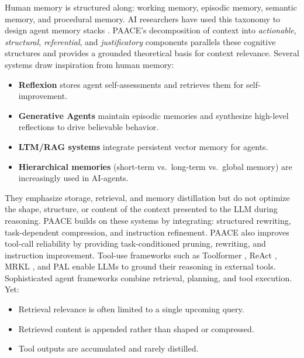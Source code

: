 \documentclass{article}
\theoremstyle{plain}
\theoremstyle{definition}
\theoremstyle{remark}
\begin{document}
Human memory is structured along:
working memory, episodic memory, semantic memory, and procedural memory.
AI researchers have used this taxonomy to design agent memory stacks
\citep{park2023generative, shinn2023reflexion}. PAACE’s decomposition of context into
\emph{actionable}, \emph{structural}, \emph{referential}, and
\emph{justificatory} components parallels these cognitive structures and provides
a grounded theoretical basis for context relevance. Several systems draw inspiration from human memory:
\begin{itemize}[topsep=2pt,itemsep=1pt,parsep=0pt]
    \item \textbf{Reflexion} \citep{shinn2023reflexion} stores agent self-assessments
    and retrieves them for self-improvement.
    \item \textbf{Generative Agents} \citep{park2023generative} maintain episodic memories
    and synthesize high-level reflections to drive believable behavior.
    \item \textbf{LTM/RAG systems} integrate persistent vector memory for agents.
    \item \textbf{Hierarchical memories} (short-term vs.\ long-term vs.\ global memory)
    are increasingly used in AI-agents.
\end{itemize}


They emphasize storage, retrieval, and memory distillation but do not
optimize the shape, structure, or content of the context presented to the LLM
during reasoning. PAACE builds on these systems by integrating:
structured rewriting, task-dependent compression, and instruction refinement. PAACE also improves tool-call reliability by providing
task-conditioned pruning, rewriting, and instruction improvement. Tool-use frameworks such as Toolformer \citep{schick2023toolformer},
ReAct \citep{yao2023react},
MRKL \citep{mrkl2022},
and PAL \citep{gao2023pal}
enable LLMs to ground their reasoning in external tools. Sophisticated agent frameworks 
combine retrieval, planning, and tool execution.
Yet:
\begin{itemize}\setlength{\itemsep}{0pt}
    \item Retrieval relevance is often limited to a single upcoming query.
    \item Retrieved content is appended rather than shaped or compressed.
    \item Tool outputs are accumulated and rarely distilled.
\end{itemize}
\end{document}
